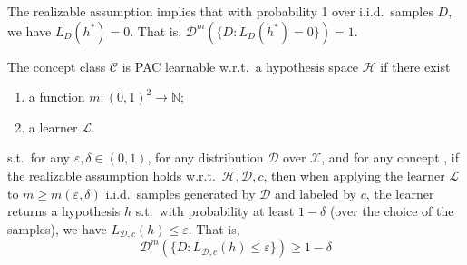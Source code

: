 \begin{re}
    The realizable assumption implies that with probability 1 over i.i.d.\ samples $D$, we have $L_D(h^*) = 0$.
    That is, $\mathcal{D}^m(\{D: L_D(h^*) = 0\}) = 1$.
\end{re}

\begin{df}
    The concept class $\mathcal{C}$ is PAC learnable w.r.t.\ a hypothesis space $\mathcal{H}$ if there exist
    \begin{enumerate}
        \item a function $m: {(0, 1)}^2 \longrightarrow \mathbb{N}$;
        \item a learner $\mathcal{L}$.
    \end{enumerate}
    s.t.\ for any $\varepsilon, \delta \in (0, 1)$, for any distribution $\mathcal{D}$ over $\mathcal{X}$, and
    for any concept , if the realizable assumption holds w.r.t.\ $\mathcal{H}, \mathcal{D}, c$, then
    when applying the learner $\mathcal{L}$ to $m \geq m(\varepsilon, \delta)$ i.i.d.\ samples generated by
    $\mathcal{D}$ and labeled by $c$, the learner returns a hypothesis $h$ s.t.\ with probability at least 
    $1 - \delta$ (over the choice of the samples), we have $L_{\mathcal{D},c}(h) \leq \varepsilon$. That is,
    $$\mathcal{D}^m(\{D: L_{\mathcal{D},c}(h) \leq \varepsilon\}) \geq 1 - \delta$$
\end{df}



